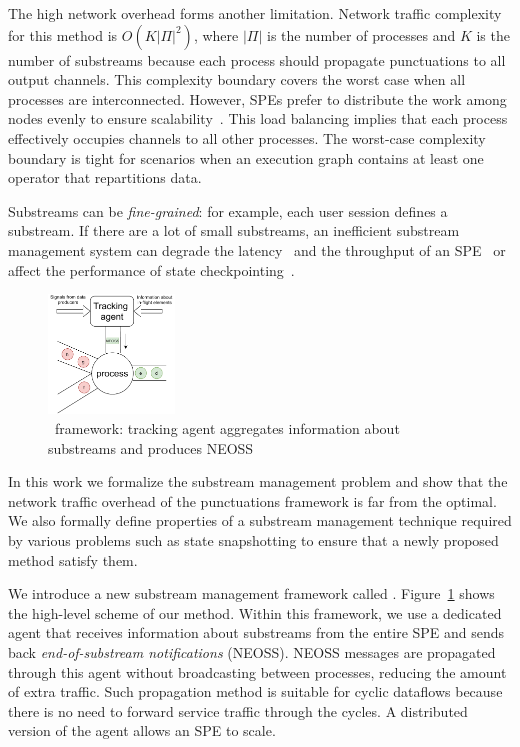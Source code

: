 The high network overhead forms another limitation. Network traffic complexity for this method is $O(K|\Pi|^2)$, where $|\Pi|$ is the number of processes and $K$ is the number of substreams because each process should propagate punctuations to all output channels. This complexity boundary covers the worst case when all processes are interconnected. However, SPEs prefer to distribute the work among nodes evenly to ensure scalability~\cite{carbone2015apache, Kulkarni:2015:THS:2723372.2742788, Akidau:2013:MFS:2536222.2536229}. This load balancing implies that each process effectively occupies channels to all other processes. The worst-case complexity boundary is tight for scenarios when an execution graph contains at least one operator that repartitions data.

Substreams can be {\em fine-grained}: for example, each user session defines a substream. If there are a lot of small substreams, an inefficient substream management system can degrade the latency~\cite{DBLP:journals/pvldb/BegoliACHKKMS21} and the throughput of an SPE~\cite{Li:2008:OPN:1453856.1453890} or affect the performance of state checkpointing~\cite{zhang2021research}.

\begin{figure}[t]
  \centering
  \includegraphics[width=0.30\textwidth]{pics/tracker-scheme.pdf}
  \caption{\tracker\ framework: tracking agent aggregates information about substreams and produces NEOSS}
  \label{tracker_scheme}
\end{figure}

In this work we formalize the substream management problem and show that the network traffic overhead of the punctuations framework is far from the optimal. We also formally define properties of a substream management technique required by various problems such as state snapshotting to ensure that a newly proposed method satisfy them. 

We introduce a new substream management framework called \tracker. Figure~\ref{tracker_scheme} shows the high-level scheme of our method. 
Within this framework, we use a dedicated agent that receives information about substreams from the entire SPE and sends back {\em end-of-substream notifications} (NEOSS). 
NEOSS messages are propagated through this agent without broadcasting between processes, reducing the amount of extra traffic. Such propagation method is suitable for cyclic dataflows because there is no need to forward service traffic through the cycles. A distributed version of the agent allows an SPE to scale.

